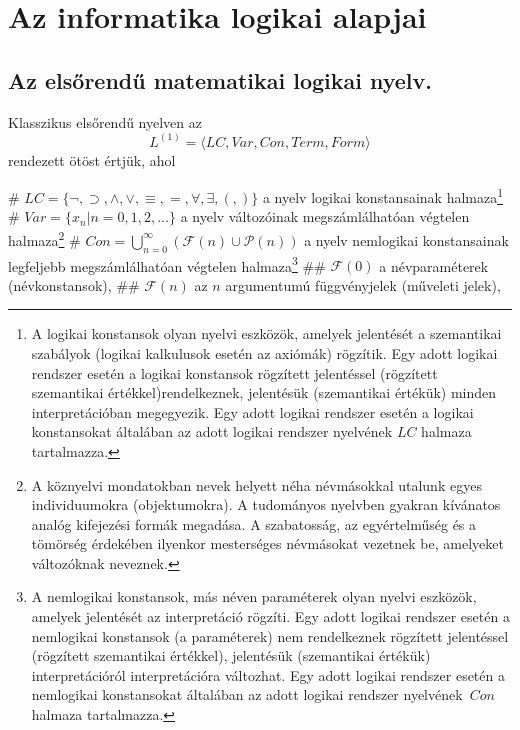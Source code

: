 \section{Az informatika logikai alapjai}
\def\InterpretOnNu{^{\langle U, \rho \rangle}_{\nu}}
\subsection{Az elsőrendű matematikai logikai nyelv.}
\begin{definition}
	Klasszikus elsőrendű nyelven az $$ L^{(1)} = \langle LC,Var,Con,Term,Form\rangle $$ rendezett ötöst értjük, ahol
	\begin{easylist}
	# $LC = \{\neg,\supset,\land,\lor,\equiv,=,\forall,\exists,(,)\}$ a nyelv logikai konstansainak halmaza\footnote{A logikai konstansok olyan nyelvi eszközök, amelyek jelentését a szemantikai szabályok (logikai kalkulusok esetén az axiómák) rögzítik. Egy adott logikai rendszer esetén a logikai konstansok rögzített jelentéssel (rögzített szemantikai értékkel)rendelkeznek, jelentésük (szemantikai értékük) minden interpretációban megegyezik. Egy adott logikai rendszer esetén a logikai konstansokat általában az adott logikai rendszer nyelvének $LC$	halmaza tartalmazza.}
	# $Var = \{x_{n}| n = 0,1,2,\dots\}$ a nyelv változóinak megszámlálhatóan végtelen halmaza\footnote{A köznyelvi mondatokban nevek helyett néha névmásokkal utalunk egyes individuumokra (objektumokra). A tudományos nyelvben gyakran kívánatos analóg kifejezési formák megadása. A szabatosság, az egyértelműség és a tömörség érdekében ilyenkor mesterséges névmásokat vezetnek be, amelyeket változóknak neveznek.}
	# $Con = \bigcup_{n=0}^\infty(\mathcal{F}(n)\cup\mathcal{P}(n))$ a nyelv nemlogikai konstansainak legfeljebb megszámlálhatóan végtelen halmaza\footnote{A nemlogikai konstansok, más néven paraméterek olyan nyelvi eszközök, amelyek jelentését az interpretáció rögzíti. Egy adott logikai rendszer esetén a nemlogikai konstansok (a paraméterek) nem rendelkeznek rögzített jelentéssel (rögzített szemantikai értékkel), jelentésük (szemantikai értékük) interpretációról interpretációra változhat. Egy adott logikai rendszer esetén a nemlogikai konstansokat általában az adott logikai rendszer nyelvének $Con$ halmaza tartalmazza.}
	## $\mathcal{F}(0)$ a névparaméterek (névkonstansok),
	## $\mathcal{F}(n)$ az $ n $ argumentumú függvényjelek (műveleti jelek),

\end{easylist}
\end{definition}

